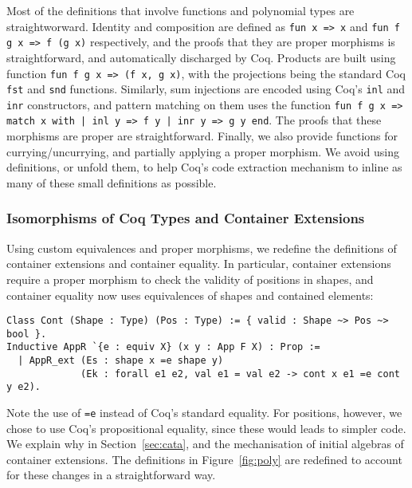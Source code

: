 \documentclass[a4paper, UKenglish, cleveref, autoref, thm-restate]{lipics-v2021}
\begin{document}
Most of the definitions that involve functions and polynomial types are
straightworward.  Identity and composition are defined as 
\texttt{fun x => x} and \texttt{fun f g x => f (g x)} 
respectively, and the proofs that they are proper morphisms is straightforward,
and automatically discharged by Coq. 
Products are built using function \texttt{fun f g x => (f x, g x)},
with the projections being the standard Coq  \texttt{fst} and
\texttt{snd} functions. Similarly, sum injections are encoded using
Coq's \texttt{inl} and \texttt{inr} constructors, and
pattern matching on them uses the function 
\texttt{fun f g x => match x with | inl y => f y | inr y => g y end}.
The proofs that these morphisms are proper are straightforward.  Finally, we
also provide functions for currying/uncurrying, and partially applying a proper
morphism. We avoid using definitions, or unfold them, to help Coq's code
extraction mechanism to inline as many of these small definitions as possible.

\subsubsection{Isomorphisms of Coq Types and Container Extensions}

Using custom equivalences and proper morphisms, we redefine the definitions of
container extensions and container equality. In particular, container
extensions require a proper morphism to check the validity of positions in
shapes, and container equality now uses equivalences of shapes and contained
elements: 
\begin{verbatim}
Class Cont (Shape : Type) (Pos : Type) := { valid : Shape ~> Pos ~> bool }.
Inductive AppR `{e : equiv X} (x y : App F X) : Prop :=
  | AppR_ext (Es : shape x =e shape y)
             (Ek : forall e1 e2, val e1 = val e2 -> cont x e1 =e cont y e2).
\end{verbatim}
Note the use of \texttt{=e} instead of Coq's standard equality.  For
positions, however, we chose to use Coq's propositional equality, since these
would leads to simpler code. We explain why in Section~\ref{sec:cata}, and the
mechanisation of initial algebras of container extensions. The definitions in
Figure~\ref{fig:poly} are redefined to account for these changes in a
straightforward way.
\end{document}
